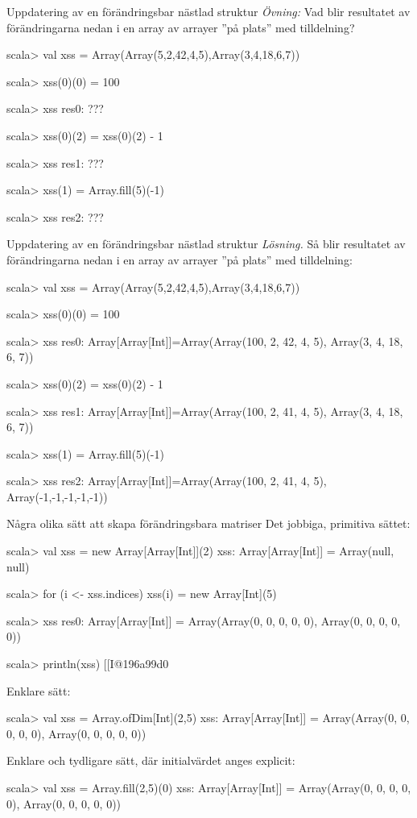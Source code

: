 \begin{Slide}{Uppdatering av en förändringsbar nästlad struktur}
\emph{Övning:} Vad blir resultatet av förändringarna nedan i en array av arrayer ''på plats'' med tilldelning?
\begin{REPL}
scala> val xss = Array(Array(5,2,42,4,5),Array(3,4,18,6,7))

scala> xss(0)(0) = 100

scala> xss
res0: ???

scala> xss(0)(2) = xss(0)(2) - 1

scala> xss
res1: ???

scala> xss(1) = Array.fill(5)(-1)

scala> xss
res2: ???
\end{REPL}
\end{Slide}

\begin{Slide}{Uppdatering av en förändringsbar nästlad struktur}
\emph{Lösning.} Så blir resultatet av förändringarna nedan i en array av arrayer ''på plats'' med tilldelning:
\begin{REPL}
scala> val xss = Array(Array(5,2,42,4,5),Array(3,4,18,6,7))

scala> xss(0)(0) = 100

scala> xss
res0: Array[Array[Int]]=Array(Array(100, 2, 42, 4, 5), Array(3, 4, 18, 6, 7))

scala> xss(0)(2) = xss(0)(2) - 1

scala> xss
res1: Array[Array[Int]]=Array(Array(100, 2, 41, 4, 5), Array(3, 4, 18, 6, 7))

scala> xss(1) = Array.fill(5)(-1)

scala> xss
res2: Array[Array[Int]]=Array(Array(100, 2, 41, 4, 5), Array(-1,-1,-1,-1,-1))
\end{REPL}
\end{Slide}

\begin{Slide}{Några olika sätt att skapa förändringsbara matriser}\SlideFontSmall
Det jobbiga, primitiva sättet:
\begin{REPL}
scala> val xss = new Array[Array[Int]](2)
xss: Array[Array[Int]] = Array(null, null)

scala> for (i <- xss.indices) {xss(i) = new Array[Int](5)}

scala> xss
res0: Array[Array[Int]] = Array(Array(0, 0, 0, 0, 0), Array(0, 0, 0, 0, 0))

scala> println(xss)
[[I@196a99d0
\end{REPL}
Enklare sätt:
\begin{REPL}
scala> val xss = Array.ofDim[Int](2,5)
xss: Array[Array[Int]] = Array(Array(0, 0, 0, 0, 0), Array(0, 0, 0, 0, 0))
\end{REPL}
Enklare och tydligare sätt, där initialvärdet anges explicit:
\begin{REPL}
scala> val xss = Array.fill(2,5)(0)
xss: Array[Array[Int]] = Array(Array(0, 0, 0, 0, 0), Array(0, 0, 0, 0, 0))
\end{REPL}

\end{Slide}

